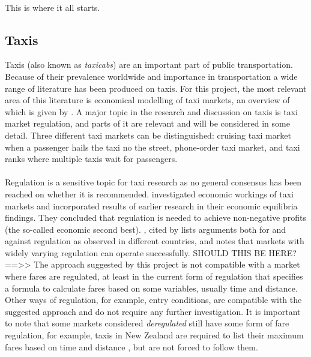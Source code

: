 \paragraph{}
This is where it all starts.

\subsection{Taxis}
Taxis (also known as \textit{taxicabs}) are an important part of public transportation. Because of their prevalence worldwide and importance in transportation a wide range of literature has been produced on taxis. For this project, the most relevant area of this literature is economical modelling of taxi markets, an overview of which is given by \textcite{Salanova2011taxi+review}. A major topic in the research and discussion on taxis is taxi market regulation, and parts of it are relevant and will be considered in some detail. Three different taxi markets can be distinguished: cruising taxi market when a passenger hails the taxi no the street, phone-order taxi market, and taxi ranks where multiple taxis wait for passengers.
\paragraph{}Regulation is a sensitive topic for taxi research as no general consensus has been reached on whether it is recommended. \textcite{Cairns1996taxi+competition} investigated economic workings of taxi markets and incorporated results of earlier research in their economic equilibria findings. They concluded that regulation is needed to achieve non-negative profits (the so-called economic second best). \textcite{Oecd2007taxi+policy}, cited by \textcite{Salanova2011taxi+review} lists arguments both for and against regulation as observed in different countries, and notes that markets with widely varying regulation can operate successfully. SHOULD THIS BE HERE? ==>> The approach suggested by this project is not compatible with a market where fares are regulated, at least in the current form of regulation that specifies a formula to calculate fares based on some variables, usually time and distance. Other ways of regulation, for example, entry conditions, are compatible with the suggested approach and do not require any further investigation. It is important to note that some markets considered \textit{deregulated} still have some form of fare regulation, for example, taxis in New Zealand are required to list their maximum fares based on time and distance \parencite{Gaunt1995taxi+newzealand}, but are not forced to follow them.
